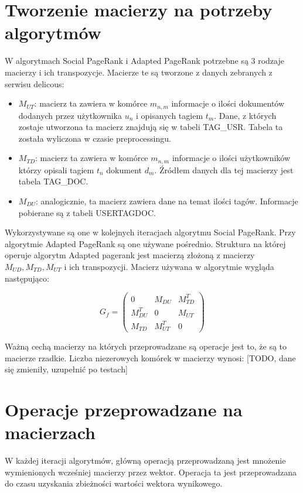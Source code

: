 
\section{Tworzenie macierzy na potrzeby algorytmów}
W algorytmach Social PageRank i Adapted PageRank potrzebne są 3 rodzaje macierzy i ich transpozycje. Macierze te są tworzone z danych zebranych z serwisu delicous:
\begin{itemize}
	\item $M_{UT}$: macierz ta zawiera w komórce $m_{n,m}$ informacje o ilości dokumentów dodanych przez użytkownika $u_n$ i opisanych tagiem $t_m$. Dane, z których zostaje utworzona ta macierz znajdują się w tabeli TAG\_USR. Tabela ta została wyliczona w czasie preprocessingu.
	\item $M_{TD}$: macierz ta zawiera w komórce $m_{n,m}$ informacje o ilości użytkowników którzy opisali tagiem $t_n$ dokument $d_m$. Źródłem danych dla tej macierzy jest tabela TAG\_DOC.
	\item $M_{DU}$: analogicznie, ta macierz zawiera dane na temat ilości tagów. Informacje pobierane są z tabeli USERTAGDOC.
\end{itemize}

Wykorzystywane są one w kolejnych iteracjach algorytmu Social PageRank. Przy algorytmie Adapted PageRank są one używane pośrednio. Struktura na której operuje algorytm Adapted pagerank jest macierzą złożoną z macierzy $M_{UD} , M_{TD}, M_{UT}$ i ich transpozycji. Macierz używana w algorytmie wygląda następująco:

\[
 G_f =
 \begin{pmatrix}
  0                     & M_{DU}       & M_{TD}^T \\
  M_{DU}^T  & 0                     & M_{UT}     \\
  M_{TD}       & M_{UT}^T   & 0 
 \end{pmatrix}
\]

Ważną cechą macierzy na których przeprowadzane są operacje jest to, że są to macierze rzadkie. Liczba niezerowych komórek w macierzy wynosi:  [TODO, dane się zmieniły, uzupełnić po testach]

\section{Operacje przeprowadzane na macierzach}
W każdej iteracji algorytmów, główną operacją przeprowadzaną jest mnożenie wymienionych wcześniej macierzy przez wektor. Operacja ta jest przeprowadzana do czasu uzyskania zbieżności wartości wektora wynikowego.

